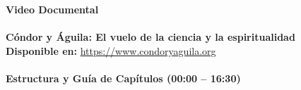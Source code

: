 \documentclass[10pt]{article}
\newenvironment{extraer}[1]{}{}
\begin{document}
	\noindent
	\begin{tcolorbox}[titleBoxStyle, width=\textwidth]
		\centering
		{\Large\color{deepblue}\bfseries\begin{extraer}{p2_title}Video Documental\end{extraer}}\\[0.03cm]
		\\[0.03cm]
		{\small\bfseries\color{golddark}\begin{extraer}{p2_sub}Cóndor y Águila: El vuelo de la ciencia y la espiritualidad\end{extraer}}\\[0.06cm]
		{\small\textbf{Disponible en: } \url{https://www.condoryaguila.org}}\\[0.06cm]
		\\[0.04cm]
		{\footnotesize\bfseries\color{deepblue}\begin{extraer}{p2_temario}Estructura y Guía de Capítulos (00:00 -- 16:30)\end{extraer}}
	\end{tcolorbox}
	
	\vspace{0.08cm}
	
\end{document}
